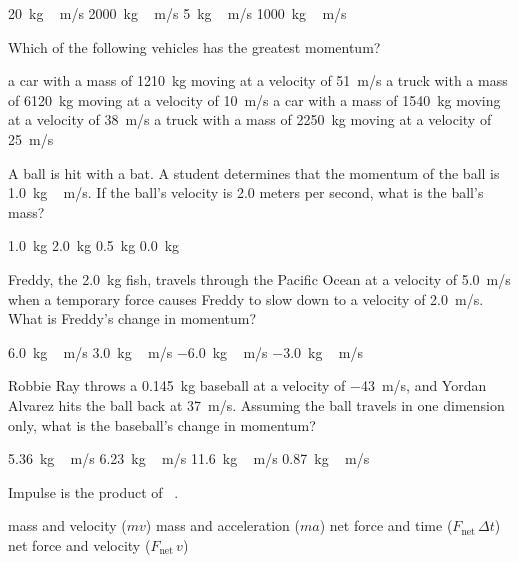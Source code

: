 \documentclass[../main-physics-problems.tex]{subfiles}
\begin{document}
\begin{questions}
\begin{randomizechoices}
\choice \SI{20}{kg\,m/s}
\correctchoice \SI{2000}{kg\,m/s}
\choice \SI{5}{kg\,m/s}
\choice \SI{1000}{kg\,m/s}
\end{randomizechoices}

\question
Which of the following vehicles has the greatest momentum?

\begin{randomizechoices}
\correctchoice a car with a mass of \SI{1210}{kg} moving at a velocity of \SI{51}{m/s}
\choice a truck with a mass of \SI{6120}{kg} moving at a velocity of \SI{10}{m/s}
\choice a car with a mass of \SI{1540}{kg} moving at a velocity of \SI{38}{m/s}
\choice a truck with a mass of \SI{2250}{kg} moving at a velocity of \SI{25}{m/s}
\end{randomizechoices}

\question
A ball is hit with a bat. A student determines that the momentum of the ball is \SI{1.0}{kg\,m/s}. If the ball's velocity is 2.0 meters per second, what is the ball's mass?

\begin{randomizechoices}
\choice \SI{1.0}{kg}
\choice \SI{2.0}{kg}
\correctchoice \SI{0.5}{kg}
\choice \SI{0.0}{kg}
\end{randomizechoices}

\question
Freddy, the \SI{2.0}{kg} fish, travels through the Pacific Ocean at a velocity of \SI{5.0}{m/s} when a temporary force causes Freddy to slow down to a velocity of \SI{2.0}{m/s}. What is Freddy's change in momentum?

\begin{randomizechoices}
\choice \SI{6.0}{kg\,m/s}
\choice \SI{3.0}{kg\,m/s}
\correctchoice \SI{-6.0}{kg\,m/s}
\choice \SI{-3.0}{kg\,m/s}
\end{randomizechoices}

\question
Robbie Ray throws a \SI{0.145}{kg} baseball at a velocity of \SI{-43}{m/s}, and Yordan Alvarez hits the ball back at \SI{37}{m/s}. Assuming the ball travels in one dimension only, what is the baseball's change in momentum?

\begin{randomizechoices}
\choice \SI{5.36}{kg\,m/s}
\choice \SI{6.23}{kg\,m/s}
\correctchoice \SI{11.6}{kg\,m/s}
\choice \SI{0.87}{kg\,m/s}
\end{randomizechoices}

\question
Impulse is the product of \fillin\ .

\begin{randomizechoices}
\choice mass and velocity ($mv$)
\choice mass and acceleration ($ma$)
\correctchoice net force and time ($F_{\text{net}}\,\Delta t$)
\choice net force and velocity ($F_{\text{net}}\,v$)
\end{randomizechoices}


\end{questions}
\end{document}
